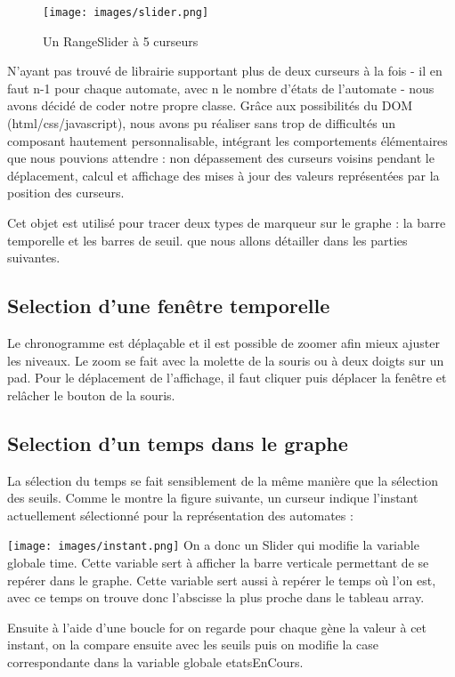 \begin{figure}[!h]
  \centering
  \texttt{[image: images/slider.png]}
  \caption{Un RangeSlider à 5 curseurs}
\end{figure}
N’ayant pas trouvé de librairie supportant plus de deux curseurs à la fois - il en faut n-1 pour chaque automate, avec n le nombre d’états de l’automate - nous avons décidé de coder notre propre classe. Grâce aux possibilités du DOM (html/css/javascript), nous avons pu réaliser sans trop de difficultés un composant hautement personnalisable, intégrant les comportements élémentaires que nous pouvions attendre : non dépassement des curseurs voisins pendant le déplacement, calcul et affichage des mises à jour des valeurs représentées par la position des curseurs.

Cet objet est utilisé pour tracer deux types de marqueur sur le graphe : la barre temporelle et les barres de seuil. que nous allons détailler dans les parties suivantes.
\bigbreak

\subsection{Selection d'une fenêtre temporelle}
\bigbreak
Le chronogramme est déplaçable et il est possible de zoomer afin mieux ajuster les niveaux. Le zoom se fait avec la molette de la souris ou à deux doigts sur un pad. Pour le déplacement de l’affichage, il faut cliquer puis déplacer la fenêtre et relâcher le bouton de la souris.
\bigbreak

\subsection{Selection d'un temps dans le graphe}
\bigbreak
La sélection du temps se fait sensiblement de la même manière que la sélection des seuils. Comme le montre la figure suivante, un curseur indique l’instant actuellement sélectionné pour la représentation des automates :

\vbox{
  \centering
  \texttt{[image: images/instant.png]}
}
\bigbreak
 On a donc un Slider qui modifie la variable globale time. Cette variable sert à afficher la barre verticale permettant de se repérer dans le graphe.
Cette variable sert aussi à repérer le temps où l’on est, avec ce temps on trouve donc l’abscisse la plus proche dans le tableau array.

Ensuite à l’aide d’une boucle for on regarde pour chaque gène la valeur à cet instant, on la compare ensuite avec les seuils puis on modifie la case correspondante dans la variable globale etatsEnCours. 

